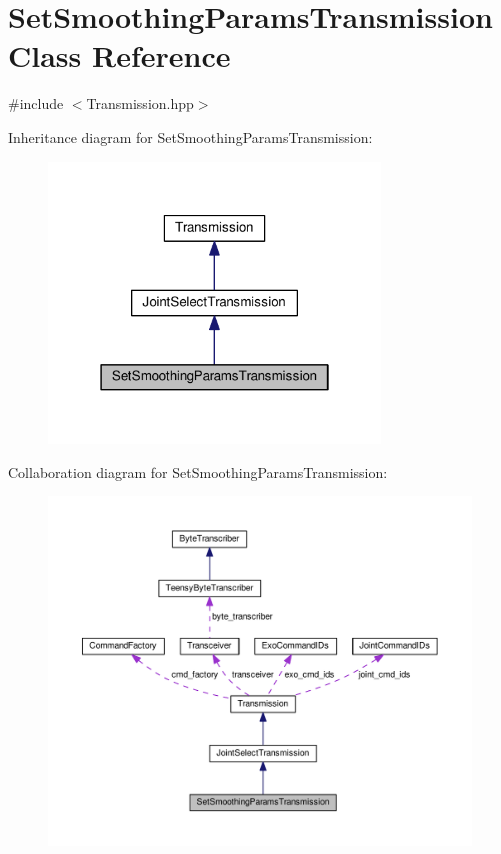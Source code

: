 \hypertarget{classSetSmoothingParamsTransmission}{}\section{Set\+Smoothing\+Params\+Transmission Class Reference}
\label{classSetSmoothingParamsTransmission}


{\ttfamily \#include $<$Transmission.\+hpp$>$}



Inheritance diagram for Set\+Smoothing\+Params\+Transmission\+:\nopagebreak
\begin{figure}[H]
\begin{center}
\leavevmode
\includegraphics[width=250pt]{classSetSmoothingParamsTransmission__inherit__graph}
\end{center}
\end{figure}


Collaboration diagram for Set\+Smoothing\+Params\+Transmission\+:
\nopagebreak
\begin{figure}[H]
\begin{center}
\leavevmode
\includegraphics[width=350pt]{classSetSmoothingParamsTransmission__coll__graph}
\end{center}
\end{figure}

